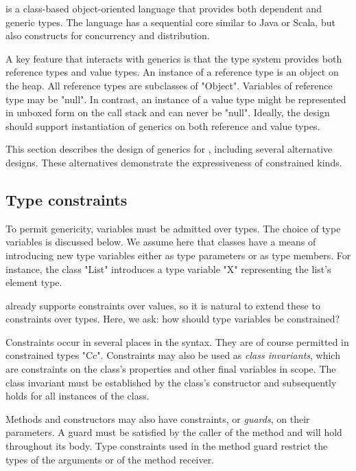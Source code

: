 \Xten{} is a class-based object-oriented language
that provides both dependent and generic types.
The language has a sequential core similar to Java or Scala, but
also
constructs for concurrency and distribution.

A key feature that interacts with generics is that the type
system provides both reference types and value types.
An instance of a reference type is an object on the
heap.  All reference types are subclasses of \xcd"Object".
Variables of reference type may be \xcd"null".
In contrast, an instance of a value type might be represented in
unboxed form on the call stack
and can never be \xcd"null".
Ideally, the design should support instantiation of generics on both 
reference and value types.

This section describes the design of generics for \Xten,
including several alternative designs.  These alternatives
demonstrate the expressiveness of constrained kinds.


\subsection{Type constraints}

To permit genericity, variables  must be admitted over types.
The choice of type variables is discussed below.  We assume here
that classes have a means of introducing new type variables
either as type parameters or as type members.
For instance,
the class \xcd"List" introduces a type variable \xcd"X"
representing the list's element type.

\Xten already supports constraints over values, so it is natural
to extend these to constraints over types.
Here, we ask: how should type variables be constrained?

Constraints occur in several places in the \Xten syntax.  They
are of course permitted in constrained types \xcd"C{c}".
Constraints may also be used as \emph{class invariants}, 
which are constraints on the class's properties and other
final variables in scope.
The class invariant must be established by the class's
constructor and subsequently holds for all instances of the
class.

Methods and constructors
may also have constraints, or \emph{guards}, on their parameters.
A guard must be satisfied by the caller of the method and
will hold throughout its body.  Type constraints used in the
method guard restrict the types of the arguments or of the method
receiver.  

